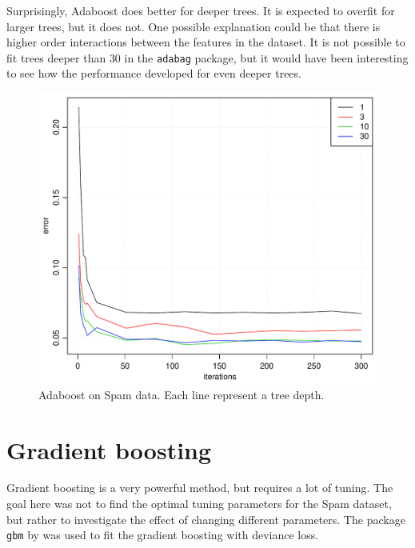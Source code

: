 Surprisingly, Adaboost does better for deeper trees. It is expected to overfit for larger trees, but it does not. One possible explanation could be that there is higher order interactions between the features in the dataset. It is not possible to fit trees deeper than $30$ in the \verb+adabag+ package, but it would have been interesting to see how the performance developed for even deeper trees.
%
\begin{figure}[h!tp]
\begin{center}
    \includegraphics[scale=0.5]{./figures/adaboostSpam.pdf}
\end{center}
\caption{Adaboost on Spam data. Each line represent a tree depth.}
\label{fig:adaboostSpam}
\end{figure}
%
\section{Gradient boosting}
\label{sec:SimGradBoost}
Gradient boosting is a very powerful method, but requires a lot of tuning. The goal here was not to find the optimal tuning parameters for the Spam dataset, but rather to investigate the effect of changing different parameters. The package \verb+gbm+ by \cite{gbm} was used to fit the gradient boosting with deviance loss.


